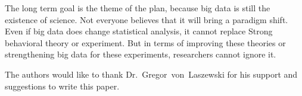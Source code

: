 The long term goal is the theme of the plan, because big data is 
still the existence of science. Not everyone believes that it will 
bring a paradigm shift. Even if big data does change statistical analysis, 
it cannot replace Strong behavioral theory or experiment. But in terms of 
improving these theories or strengthening big data for these experiments, 
researchers cannot ignore it.

\begin{acks}

  The authors would like to thank Dr.~Gregor~von~Laszewski for his
  support and suggestions to write this paper.

\end{acks}



 

